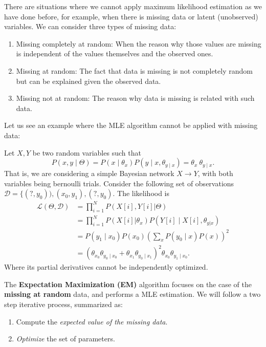 There are situations where we cannot apply maximum likelihood estimation as we have done before, for example, when there is missing data or latent (unobserved) variables. We can consider three types of missing data:

\begin{enumerate}
    \item Missing completely at random: When the reason why those values are missing is independent of the values themselves and the observed ones.
    \item Missing at random: The fact that data is missing is not completely random but can be explained given the observed data.
    \item Missing not at random: The reason why data is missing is related with such data.
\end{enumerate}

Let us see an example where the MLE algorithm cannot be applied with missing data:
\begin{example}
    Let \(X,Y\) be two random variables such that
    \[
        P(x, y \mid \Theta) = P(x \mid \theta_x)P(y \mid x, \theta_{y\mid x}) = \theta_x \ \theta_{y\mid x}.
    \]
    That is, we are considering a simple Bayesian network \( X \to Y \), with both variables being bernoulli trials. Consider the following set of observations \( \mathcal{D} = \{(?, y_0)), (x_0, y_1), (?, y_0) \). The likelihood is
    \begin{align*}
        \mathcal{L}(\Theta, \mathcal{D}) & = \prod_{i=1}^N P(X[i], Y[i] | \Theta)                                                                          \\
                                         & = \prod_{i=1}^N P(X[i]|\theta_x)P(Y[i] \mid X[i],\theta_{y|x})                                                  \\
                                         & = P(y_1 \mid x_0)P(x_0)\left(\sum_x P(y_0\mid x)P(x)\right)^2                                                   \\
                                         & = (\theta_{x_0}\theta_{y_0 \mid x_0} + \theta_{x_1}\theta_{y_0 \mid x_1} )^2 \theta_{x_0}\theta_{y_1 \mid x_0}.
    \end{align*}
    Where its partial derivatives cannot be independently optimized.
\end{example}

The \textbf{Expectation Maximization (EM)} algorithm focuses on the case of the \textbf{missing at random} data, and performs a MLE estimation. We will follow a two step iterative process, summarized as:
\begin{enumerate}
    \item Compute the \emph{expected value of the missing data}.
    \item \emph{Optimize} the set of parameters.
\end{enumerate}

